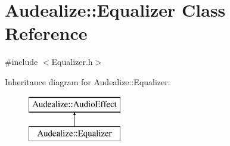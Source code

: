 \hypertarget{class_audealize_1_1_equalizer}{}\section{Audealize\+:\+:Equalizer Class Reference}
\label{class_audealize_1_1_equalizer}


{\ttfamily \#include $<$Equalizer.\+h$>$}

Inheritance diagram for Audealize\+:\+:Equalizer\+:\begin{figure}[H]
\begin{center}
\leavevmode
\includegraphics[height=2.000000cm]{class_audealize_1_1_equalizer}
\end{center}
\end{figure}
